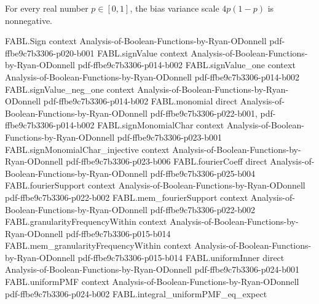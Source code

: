 \begin{theorem}
\label{FABL.biasVarianceScale_nonneg}
\leanok
{}
For every real number $p\in[0,1]$, the bias variance scale $4p(1-p)$ is nonnegative.
\end{theorem}

\begin{theorem}
\label{FABL.biasSigma_sq}
\leanok
{}
\proofstep
  {FABL.Sign}
  {context}
  {Analysis-of-Boolean-Functions-by-Ryan-ODonnell}
  {pdf-ffbe9c7b3306-p020-b001}
\proofstep
  {FABL.signValue}
  {context}
  {Analysis-of-Boolean-Functions-by-Ryan-ODonnell}
  {pdf-ffbe9c7b3306-p014-b002}
\proofstep
  {FABL.signValue_one}
  {context}
  {Analysis-of-Boolean-Functions-by-Ryan-ODonnell}
  {pdf-ffbe9c7b3306-p014-b002}
\proofstep
  {FABL.signValue_neg_one}
  {context}
  {Analysis-of-Boolean-Functions-by-Ryan-ODonnell}
  {pdf-ffbe9c7b3306-p014-b002}
\proofstep
  {FABL.monomial}
  {direct}
  {Analysis-of-Boolean-Functions-by-Ryan-ODonnell}
  {pdf-ffbe9c7b3306-p022-b001,
    pdf-ffbe9c7b3306-p014-b002}
\proofstep
  {FABL.signMonomialChar}
  {context}
  {Analysis-of-Boolean-Functions-by-Ryan-ODonnell}
  {pdf-ffbe9c7b3306-p023-b001}
\proofstep
  {FABL.signMonomialChar_injective}
  {context}
  {Analysis-of-Boolean-Functions-by-Ryan-ODonnell}
  {pdf-ffbe9c7b3306-p023-b006}
\proofstep
  {FABL.fourierCoeff}
  {direct}
  {Analysis-of-Boolean-Functions-by-Ryan-ODonnell}
  {pdf-ffbe9c7b3306-p025-b004}
\proofstep
  {FABL.fourierSupport}
  {context}
  {Analysis-of-Boolean-Functions-by-Ryan-ODonnell}
  {pdf-ffbe9c7b3306-p022-b002}
\proofstep
  {FABL.mem_fourierSupport}
  {context}
  {Analysis-of-Boolean-Functions-by-Ryan-ODonnell}
  {pdf-ffbe9c7b3306-p022-b002}
\proofstep
  {FABL.granularityFrequencyWithin}
  {context}
  {Analysis-of-Boolean-Functions-by-Ryan-ODonnell}
  {pdf-ffbe9c7b3306-p015-b014}
\proofstep
  {FABL.mem_granularityFrequencyWithin}
  {context}
  {Analysis-of-Boolean-Functions-by-Ryan-ODonnell}
  {pdf-ffbe9c7b3306-p015-b014}
\proofstep
  {FABL.uniformInner}
  {direct}
  {Analysis-of-Boolean-Functions-by-Ryan-ODonnell}
  {pdf-ffbe9c7b3306-p024-b001}
\proofstep
  {FABL.uniformPMF}
  {context}
  {Analysis-of-Boolean-Functions-by-Ryan-ODonnell}
  {pdf-ffbe9c7b3306-p024-b002}
\proofstep
  {FABL.integral_uniformPMF_eq_expect}

\end{theorem}
